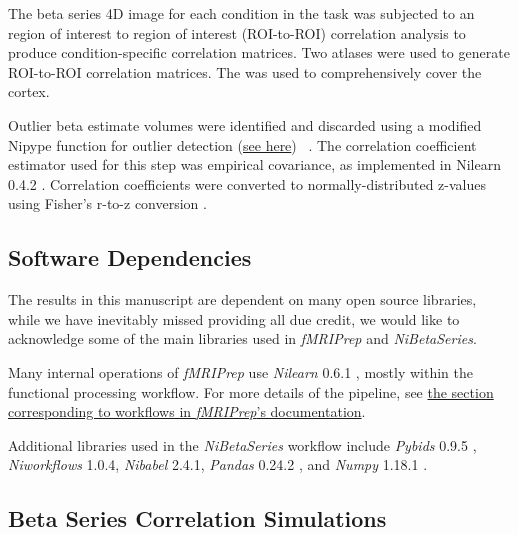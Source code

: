 \documentclass[10pt,letterpaper]{article}
\begin{document}
The beta series 4D image for each condition in the task was subjected to
an region of interest to region of interest (ROI-to-ROI) correlation analysis
to produce condition-specific correlation matrices.
Two atlases were used to generate ROI-to-ROI correlation matrices.
The \cite[Schaefer Atlas (400 parcels, 17 networks)]{Schaefer2017} was
used to comprehensively cover the cortex.

Outlier beta estimate volumes were identified and discarded using a
modified Nipype function for outlier detection
(\href{https://github.com/HBClab/NiBetaSeries/blob/a45c0a1f/src/nibetaseries/interfaces/nilearn.py#L153}{see here}) ~\cite{Crosby1994}.
The correlation coefficient estimator used for this
step was empirical covariance, as implemented in Nilearn 0.4.2
\cite{Abraham2014}. Correlation coefficients were converted to
normally-distributed z-values using Fisher's r-to-z conversion
\cite{Fisher1915}.


\subsection*{Software Dependencies}
\label{methods:software-dependencies}

The results in this manuscript are dependent on many open source
libraries, while we have inevitably missed providing all due credit,
we would like to acknowledge some of the main libraries used in 
\emph{fMRIPrep} and \emph{NiBetaSeries}.

Many internal operations of \emph{fMRIPrep} use \emph{Nilearn} 0.6.1
\cite[RRID:SCR\_001362]{nilearn}, mostly within the functional
processing workflow. For more details of the pipeline, see
\href{https://fmriprep.readthedocs.io/en/latest/workflows.html}{the
section corresponding to workflows in \emph{fMRIPrep}'s documentation}.

Additional libraries used in the \emph{NiBetaSeries} workflow include
\emph{Pybids} 0.9.5 \cite{Yarkoni2019}, \emph{Niworkflows} 1.0.4,
\emph{Nibabel} 2.4.1, \emph{Pandas} 0.24.2 \cite{McKinney2010}, and
\emph{Numpy} 1.18.1 \cite{VanDerWalt2011, Oliphant2006}.

\subsection*{Beta Series Correlation Simulations}
\label{methods:bsc-simulations}
\end{document}
